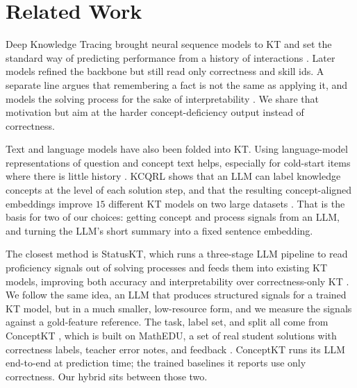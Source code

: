 \documentclass[11pt]{article}
\begin{document}
\section{Related Work}
Deep Knowledge Tracing brought neural sequence models to KT and set the standard way
of predicting performance from a history of interactions \cite{piech2015dkt}. Later
models refined the backbone but still read only correctness and skill ids. A separate
line argues that remembering a fact is not the same as applying it, and models the
solving process for the sake of interpretability \cite{huang2024remembering}. We share
that motivation but aim at the harder concept-deficiency output instead of correctness.

Text and language models have also been folded into KT. Using language-model
representations of question and concept text helps, especially for cold-start items
where there is little history \cite{lee2024lkt}. KCQRL shows that an LLM can label
knowledge concepts at the level of each solution step, and that the resulting
concept-aligned embeddings improve $15$ different KT models on two large datasets
\cite{ozyurt2024kcqrl}. That is the basis for two of our choices: getting concept and
process signals from an LLM, and turning the LLM's short summary into a fixed sentence
embedding.

The closest method is StatusKT, which runs a three-stage LLM pipeline to read
proficiency signals out of solving processes and feeds them into existing KT models,
improving both accuracy and interpretability over correctness-only KT
\cite{park2025statuskt}. We follow the same idea, an LLM that produces structured
signals for a trained KT model, but in a much smaller, low-resource form, and we
measure the signals against a gold-feature reference. The task, label set, and split all
come from ConceptKT \cite{kang2026conceptkt}, which is built on MathEDU, a set of real
student solutions with correctness labels, teacher error notes, and feedback
\cite{hsu2026mathedu}. ConceptKT runs its LLM end-to-end at prediction time; the
trained baselines it reports use only correctness. Our hybrid sits between those two.

\end{document}
